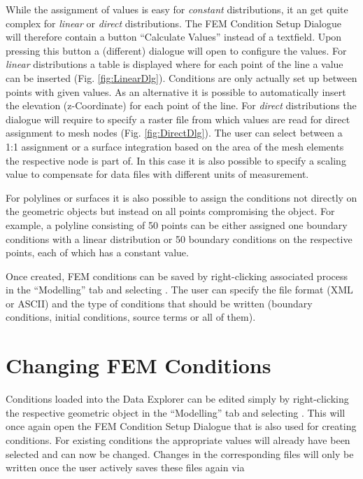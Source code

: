 While the assignment of values is easy for \emph{constant} distributions, it an get quite complex for \emph{linear} or \emph{direct} distributions. The FEM Condition Setup Dialogue will therefore contain a button ``Calculate Values'' instead of a textfield. Upon pressing this button a (different) dialogue will open to configure the values. For \emph{linear} distributions a table is displayed where for each point of the line a value can be inserted (Fig. \ref{fig:LinearDlg}). Conditions are only actually set up between points with given values. As an alternative it is possible to automatically insert the elevation (z-Coordinate) for each point of the line. For \emph{direct} distributions the dialogue will require to specify a raster file from which values are read for direct assignment to mesh nodes (Fig. \ref{fig:DirectDlg}). The user can select between a 1:1 assignment or a surface integration based on the area of the mesh elements the respective node is part of. In this case it is also possible to specify a scaling value to compensate for data files with different units of measurement.

For polylines or surfaces it is also possible to assign the conditions not directly on the geometric objects but instead on all points compromising the object. For example, a polyline consisting of 50 points can be either assigned one boundary conditions with a linear distribution or 50 boundary conditions on the respective points, each of which has a constant value.

Once created, FEM conditions can be saved by right-clicking associated process in the ``Modelling'' tab and selecting . The user can specify the file format (XML or ASCII) and the type of conditions that should be written (boundary conditions, initial conditions, source terms or all of them).

\section{Changing FEM Conditions}

Conditions loaded into the \ogs Data Explorer can be edited simply by right-clicking the respective geometric object in the ``Modelling'' tab and selecting . This will once again open the FEM Condition Setup Dialogue that is also used for creating conditions. For existing conditions the appropriate values will already have been selected and can now be changed. Changes in the corresponding files will only be written once the user actively saves these files again via 

